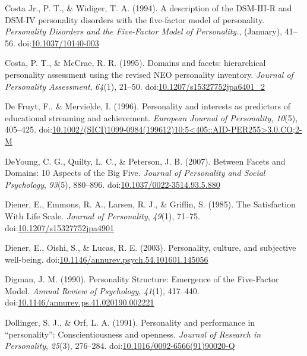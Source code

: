\documentclass[,man,floatsintext]{apa6}
\begin{document}
\hypertarget{ref-Widiger1994}{}
Costa Jr., P. T., \& Widiger, T. A. (1994). A description of the
DSM-III-R and DSM-IV personality disorders with the five-factor model of
personality. \emph{Personality Disorders and the Five-Factor Model of
Personality.}, (January), 41--56.
doi:\href{https://doi.org/10.1037/10140-003}{10.1037/10140-003}

\hypertarget{ref-Costa1995}{}
Costa, P. T., \& McCrae, R. R. (1995). Domains and facets: hierarchical
personality assessment using the revised NEO personality inventory.
\emph{Journal of Personality Assessment}, \emph{64}(1), 21--50.
doi:\href{https://doi.org/10.1207/s15327752jpa6401_2}{10.1207/s15327752jpa6401\_2}

\hypertarget{ref-DeFruyt1996}{}
De Fruyt, F., \& Mervielde, I. (1996). Personality and interests as
predictors of educational streaming and achievement. \emph{European
Journal of Personality}, \emph{10}(5), 405--425.
doi:\href{https://doi.org/10.1002/(SICI)1099-0984(199612)10:5\%3C405::AID-PER255\%3E3.0.CO;2-M}{10.1002/(SICI)1099-0984(199612)10:5\textless{}405::AID-PER255\textgreater{}3.0.CO;2-M}

\hypertarget{ref-DeYoung2007}{}
DeYoung, C. G., Quilty, L. C., \& Peterson, J. B. (2007). Between Facets
and Domains: 10 Aspects of the Big Five. \emph{Journal of Personality
and Social Psychology}, \emph{93}(5), 880--896.
doi:\href{https://doi.org/10.1037/0022-3514.93.5.880}{10.1037/0022-3514.93.5.880}

\hypertarget{ref-Diener1985}{}
Diener, E., Emmons, R. A., Larsen, R. J., \& Griffin, S. (1985). The
Satisfaction With Life Scale. \emph{Journal of Personality},
\emph{49}(1), 71--75.
doi:\href{https://doi.org/10.1207/s15327752jpa4901}{10.1207/s15327752jpa4901}

\hypertarget{ref-Diener2003}{}
Diener, E., Oishi, S., \& Lucas, R. E. (2003). Personality, culture, and
subjective well-being.
doi:\href{https://doi.org/10.1146/annurev.psych.54.101601.145056}{10.1146/annurev.psych.54.101601.145056}

\hypertarget{ref-Digman1990}{}
Digman, J. M. (1990). Personality Structure: Emergence of the
Five-Factor Model. \emph{Annual Review of Psychology}, \emph{41}(1),
417--440.
doi:\href{https://doi.org/10.1146/annurev.ps.41.020190.002221}{10.1146/annurev.ps.41.020190.002221}

\hypertarget{ref-Dollinger1991}{}
Dollinger, S. J., \& Orf, L. A. (1991). Personality and performance in
``personality'': Conscientiousness and openness. \emph{Journal of
Research in Personality}, \emph{25}(3), 276--284.
doi:\href{https://doi.org/10.1016/0092-6566(91)90020-Q}{10.1016/0092-6566(91)90020-Q}
\end{document}
